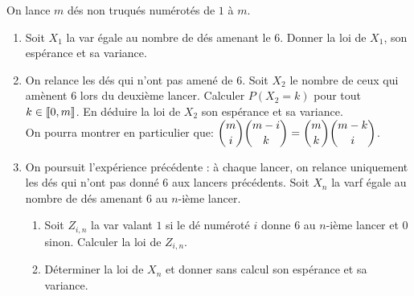 \documentclass[a4paper, 11pt,reqno]{article}
\begin{document}
\begin{exercice}  \;
	On lance $m$ d\'es non truqu\'es num\'erot\'es de $1$ \`a $m$.
	\begin{enumerate}
		\item Soit $X_1$ la var \'egale au nombre de d\'es amenant le 6. Donner la loi de $X_1$, son esp\'erance et sa variance.
		\item On relance les d\'es qui n'ont pas amen\'e de 6. Soit $X_2$ le nombre de ceux qui am\`enent 6 lors du deuxi\`eme lancer. Calculer $P(X_2=k)$ pour tout $k\in \llbracket  0,m \rrbracket$. En d\'eduire la loi de $X_2$ son esp\'erance et sa variance.\\
		      On pourra montrer en particulier que: $\displaystyle \binom{m}{i}\displaystyle \binom{m-i}{k}=\displaystyle \binom{m}{k}\displaystyle \binom{m-k}{i}$.
		\item On poursuit l'exp\'erience pr\'ec\'edente : \`a chaque lancer, on relance uniquement les d\'es qui n'ont pas donn\'e $6$ aux lancers pr\'ec\'edents. Soit $X_n$ la varf \'egale au nombre de d\'es amenant 6 au $n$-i\`eme lancer.
		      \begin{enumerate}
			      \item Soit $Z_{i,n}$ la var valant $1$ si le d\'e num\'erot\'e $i$ donne $6$ au $n$-i\`eme lancer et $0$ sinon. Calculer la loi de $Z_{i,n}$.
			      \item D\'eterminer la loi de $X_n$ et donner sans calcul son esp\'erance et sa variance.
		      \end{enumerate}
	\end{enumerate}
\end{exercice}
\end{document}
